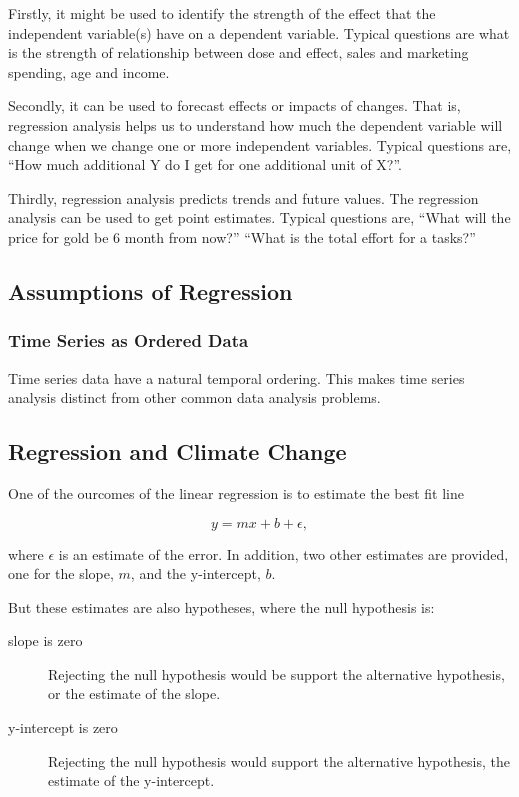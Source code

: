 \documentclass{article}\usepackage[]{graphicx}\usepackage[]{color}
\begin{document}
Firstly, it might be used to identify the strength of the effect that the independent variable(s) have on a dependent variable.  Typical questions are what is the strength of relationship between dose and effect, sales and marketing spending, age and income.

Secondly, it can be used to forecast effects or impacts of changes.  That is, regression analysis helps us to understand how much the dependent variable will change when we change one or more independent variables.  Typical questions are, “How much additional Y do I get for one additional unit of X?”.

Thirdly, regression analysis predicts trends and future values.  The regression analysis can be used to get point estimates.  Typical questions are, ``What will the price for gold be 6 month from now?'' ``What is the total effort for a tasks?''

\subsection{Assumptions of Regression}

\subsubsection{Time Series as Ordered Data}

Time series data have a natural temporal ordering. This makes time series analysis distinct from other common data analysis problems.

\subsection{Regression and Climate Change}

One of the ourcomes of the linear regression is to estimate the best fit line

\begin{equation}
y = mx + b + \epsilon,
\end{equation}

where $\epsilon$ is an estimate of the error. In addition, two other estimates are provided, one for the slope, $m$, and the y-intercept, $b$. 

But these estimates are also hypotheses, where the null hypothesis is:

\begin{description}
  \item[slope is zero] Rejecting the null hypothesis would be support the alternative hypothesis, or the estimate of the slope. 
  \item[y-intercept is zero] Rejecting the null hypothesis would support the alternative hypothesis, the estimate of the y-intercept.
\end{description}
\end{document}

